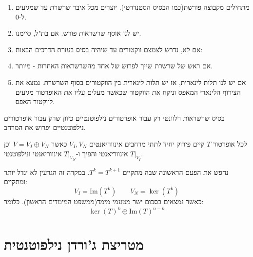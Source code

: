 \documentclass{tstextbook}
\begin{document}
\begin{proposition}
  \begin{enumerate}
    \item מתחילים מקבוצה פורשת(כמו הבסיס הסטנדרטי). יוצרים מכל איבר שרשרת עד שמגיעים ל-0. 


    \item יש לנו אוסף שרשראות פורש. אם בת"ל, סיימנו. 


    \item אם לא, נדרש לצמצם ווקטורים עד שיהיה בסיס בעזרת הדרכים הבאות: 


    \item אם ראש של שרשרת שייך לפרוש של אחד מהשרשראות האחרות - מיותר. 


    \item אם יש לנו תלות לינארית, אז יש תלות לינארית בין הווקטורים בסוף השרשרת. נמצא את הצירוף הלינארי המאפס וניקח את הווקטור שכאשר מעלים עליו את האופרטור מגיעים לווקטור האפס. 


  \end{enumerate}
\end{proposition}
\begin{remark}
בסיס שרשראות רלוונטי רק עבור אופרטורים נילפוטנטיים כיוון שרק עבור אופרטורים נילפוטנטיים יפרוש את המרחב.

\end{remark}
\begin{proposition}
לכל אופרטור \(T\) קיים פירוק יחיד לתתי מרחבים אינווריאנטים \(V_{I},V_{N}\) כאשר \(V=V_{I}\oplus V_{N}\) וכן \(T|_{V_{I}}\) אינווריאנטי והפיך ו-\(T|_{V_{N}}\) אינווריאנטי ונילפוטנטי. 

\end{proposition}
\begin{proposition}
נחפש את הפעם הראשונה שבה מתקיים \(T^{k}=T^{k+1}\). במקרה זה הגרעין לא יגדל יותר ומתקיים:
$$V_{I}=\mathrm{Im}(T^{k})\qquad  V_{N}=\ker (T^{k})$$
כאשר נמצאים בסכום ישר מטעמי מימד(ממשפט המימדים הראשון). כלומר:
$$\ker \left( T \right)^{k}\oplus \mathrm{Im}\left( T\right)^{n-k}$$

\end{proposition}
\section{מטריצת ג'ורדן נילפוטנטית}
\end{document}
